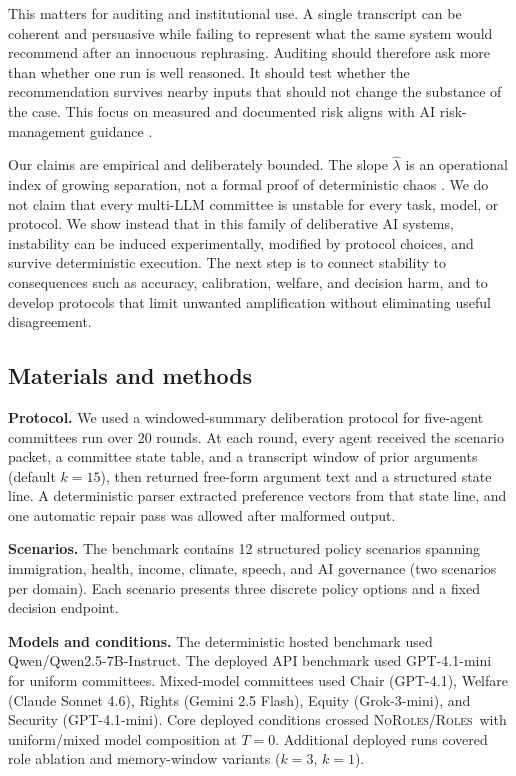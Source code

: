 \documentclass[12pt]{article}
\newcommand{\lam}{\ensuremath{\hat{\lambda}}}
\newcommand{\Roles}{\textsc{Roles}}
\newcommand{\NoRoles}{\textsc{NoRoles}}
\begin{document}
This matters for auditing and institutional use. A single transcript can be
coherent and persuasive while failing to represent what the same system would
recommend after an innocuous rephrasing. Auditing should therefore ask more than
whether one run is well reasoned. It should test whether the recommendation
survives nearby inputs that should not change the substance of the case. This
focus on measured and documented risk aligns with AI risk-management guidance
\cite{nist2023airmf}.

Our claims are empirical and deliberately bounded. The slope $\lam$ is an
operational index of growing separation, not a formal proof of deterministic
chaos \cite{eckmann1985ergodic,ott2002chaos}. We do not claim that every
multi-LLM committee is unstable for every task, model, or protocol. We show
instead that in this family of deliberative AI systems, instability can be
induced experimentally, modified by protocol choices, and survive deterministic
execution. The next step is to connect stability to consequences such as
accuracy, calibration, welfare, and decision harm, and to develop protocols that
limit unwanted amplification without eliminating useful disagreement.

\subsection*{Materials and methods}

\textbf{Protocol.} We used a windowed-summary deliberation protocol for
five-agent committees run over 20 rounds. At each round, every agent received
the scenario packet, a committee state table, and a transcript window of prior
arguments (default $k=15$), then returned free-form argument text and a
structured state line. A deterministic parser extracted preference vectors from
that state line, and one automatic repair pass was allowed after malformed
output.

\textbf{Scenarios.} The benchmark contains 12 structured policy scenarios
spanning immigration, health, income, climate, speech, and AI governance (two
scenarios per domain). Each scenario presents three discrete policy options and
a fixed decision endpoint.

\textbf{Models and conditions.} The deterministic hosted benchmark used
Qwen/Qwen2.5-7B-Instruct. The deployed API benchmark used GPT-4.1-mini for
uniform committees. Mixed-model committees used Chair (GPT-4.1), Welfare
(Claude Sonnet 4.6), Rights (Gemini 2.5 Flash), Equity (Grok-3-mini), and
Security (GPT-4.1-mini). Core deployed conditions crossed \NoRoles/\Roles\ with
uniform/mixed model composition at $T=0$. Additional deployed runs covered role
ablation and memory-window variants ($k=3$, $k=1$).
\end{document}
